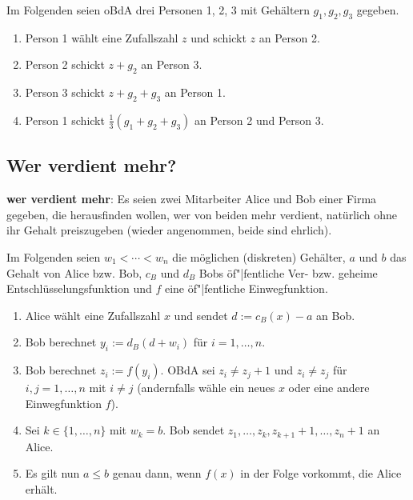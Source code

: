 Im Folgenden seien oBdA drei Personen 1, 2, 3 mit Gehältern $g_1, g_2, g_3$ gegeben.
\begin{enumerate}
    \item
    Person 1 wählt eine Zufallszahl $z$ und schickt $z$ an Person 2.
    
    \item
    Person 2 schickt $z + g_2$ an Person 3.
    
    \item
    Person 3 schickt $z + g_2 + g_3$ an Person 1.
    
    \item
    Person 1 schickt $\frac{1}{3} (g_1 + g_2 + g_3)$ an Person 2 und Person 3.
\end{enumerate}

\subsection{%
    Wer verdient mehr?%
}

\textbf{wer verdient mehr}:
Es seien zwei Mitarbeiter Alice und Bob einer Firma gegeben,
die herausfinden wollen, wer von beiden mehr
verdient, natürlich ohne ihr Gehalt preiszugeben
(wieder angenommen, beide sind ehrlich).

Im Folgenden seien $w_1 < \dotsb < w_n$ die möglichen (diskreten) Gehälter,
$a$ und $b$ das Gehalt von Alice bzw. Bob,
$c_B$ und $d_B$ Bobs öf"|fentliche Ver- bzw. geheime Entschlüsselungsfunktion
und $f$ eine öf"|fentliche Einwegfunktion.
\begin{enumerate}
    \item
    Alice wählt eine Zufallszahl $x$ und sendet $d := c_B(x) - a$ an Bob.
    
    \item
    Bob berechnet $y_i := d_B(d + w_i)$ für $i = 1, \dotsc, n$.
    
    \item
    Bob berechnet $z_i := f(y_i)$.
    OBdA sei $z_i \not= z_j + 1$ und $z_i \not= z_j$
    für $i, j = 1, \dotsc, n$ mit $i \not= j$
    (andernfalls wähle ein neues $x$ oder eine andere Einwegfunktion $f$).
    
    \item
    Sei $k \in \{1, \dotsc, n\}$ mit $w_k = b$.
    Bob sendet $z_1, \dotsc, z_k, z_{k+1} + 1, \dotsc, z_n + 1$ an Alice.
    
    \item
    Es gilt nun $a \le b$ genau dann, wenn $f(x)$ in der Folge vorkommt, die Alice erhält.
\end{enumerate}

